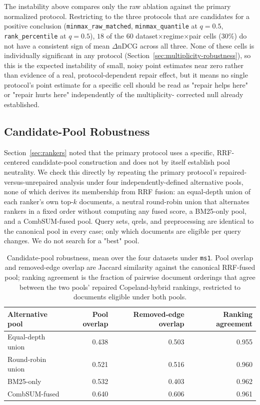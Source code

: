 \documentclass[manuscript,anonymous,review]{acmart}
\begin{document}
The instability above compares only the raw ablation against the primary
normalized protocol. Restricting to the three protocols that are candidates
for a positive conclusion (\texttt{minmax\_raw\_matched},
\texttt{minmax\_quantile} at $q=0.5$, \texttt{rank\_percentile} at
$q=0.5$), $18$ of the $60$ dataset$\times$regime$\times$pair cells ($30\%$)
do not have a consistent sign of mean $\Delta$nDCG across all three. None of
these cells is individually significant in any protocol
(Section~\ref{sec:multiplicity-robustness}), so this is the expected
instability of small, noisy point estimates near zero rather than evidence
of a real, protocol-dependent repair effect, but it means no single
protocol's point estimate for a specific cell should be read as "repair
helps here" or "repair hurts here" independently of the multiplicity-
corrected null already established.

\subsection{Candidate-Pool Robustness}
\label{sec:pool-robustness}

Section~\ref{sec:rankers} noted that the primary protocol uses a specific,
RRF-centered candidate-pool construction and does not by itself establish
pool neutrality. We check this directly by repeating the primary protocol's
repaired-versus-unrepaired analysis under four independently-defined
alternative pools, none of which derives its membership from RRF fusion:
an equal-depth union of each ranker's own top-$k$ documents, a neutral
round-robin union that alternates rankers in a fixed order without
computing any fused score, a BM25-only pool, and a CombSUM-fused pool.
Query sets, qrels, and preprocessing are identical to the canonical pool in
every case; only which documents are eligible per query changes. We do not
search for a "best" pool.

\begin{table}[t]
  \caption{Candidate-pool robustness, mean over the four datasets under
    \texttt{ms1}. Pool overlap and removed-edge overlap are Jaccard
    similarity against the canonical RRF-fused pool; ranking agreement is
    the fraction of pairwise document orderings that agree between the two
    pools' repaired Copeland-hybrid rankings, restricted to documents
    eligible under both pools.}
  \label{tab:pool-robustness}
  \scriptsize
  \begin{tabular}{lrrr}
    \toprule
    Alternative pool & Pool overlap & Removed-edge overlap & Ranking agreement \\
    \midrule
    Equal-depth union   & 0.438 & 0.503 & 0.955 \\
    Round-robin union   & 0.521 & 0.516 & 0.960 \\
    BM25-only           & 0.532 & 0.403 & 0.962 \\
    CombSUM-fused       & 0.640 & 0.606 & 0.961 \\
    \bottomrule
  \end{tabular}
\end{table}
\end{document}
